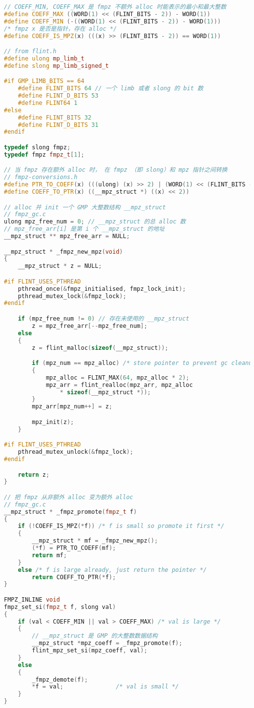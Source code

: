 \begin{lstlisting}[language=cpp]
// COEFF_MIN, COEFF_MAX 是 fmpz 不额外 alloc 时能表示的最小和最大整数
#define COEFF_MAX ((WORD(1) << (FLINT_BITS - 2)) - WORD(1))
#define COEFF_MIN (-((WORD(1) << (FLINT_BITS - 2)) - WORD(1)))
/* fmpz x 是否是指针，存在 alloc */
#define COEFF_IS_MPZ(x) (((x) >> (FLINT_BITS - 2)) == WORD(1))

// from flint.h
#define ulong mp_limb_t
#define slong mp_limb_signed_t

#if GMP_LIMB_BITS == 64
    #define FLINT_BITS 64 // 一个 limb 或者 slong 的 bit 数
    #define FLINT_D_BITS 53
    #define FLINT64 1
#else 
    #define FLINT_BITS 32
    #define FLINT_D_BITS 31
#endif

typedef slong fmpz;
typedef fmpz fmpz_t[1];

// 当 fmpz 存在额外 alloc 时， 在 fmpz （即 slong）和 mpz 指针之间转换
// fmpz-conversions.h
#define PTR_TO_COEFF(x) (((ulong) (x) >> 2) | (WORD(1) << (FLINT_BITS - 2)))
#define COEFF_TO_PTR(x) ((__mpz_struct *) ((x) << 2))

// alloc 并 init 一个 GMP 大整数结构 __mpz_struct
// fmpz_gc.c
ulong mpz_free_num = 0; // __mpz_struct 的总 alloc 数
// mpz_free_arr[i] 是第 i 个 __mpz_struct 的地址
__mpz_struct ** mpz_free_arr = NULL;

__mpz_struct * _fmpz_new_mpz(void)
{
    __mpz_struct * z = NULL;

#if FLINT_USES_PTHREAD
    pthread_once(&fmpz_initialised, fmpz_lock_init);
    pthread_mutex_lock(&fmpz_lock);
#endif

    if (mpz_free_num != 0) // 存在未使用的 __mpz_struct
        z = mpz_free_arr[--mpz_free_num];
    else
    {
        z = flint_malloc(sizeof(__mpz_struct));

        if (mpz_num == mpz_alloc) /* store pointer to prevent gc cleanup */
        {
            mpz_alloc = FLINT_MAX(64, mpz_alloc * 2);
            mpz_arr = flint_realloc(mpz_arr, mpz_alloc
                * sizeof(__mpz_struct *));
        }
        mpz_arr[mpz_num++] = z;

        mpz_init(z);
    }

#if FLINT_USES_PTHREAD
    pthread_mutex_unlock(&fmpz_lock);
#endif

    return z;
}

// 把 fmpz 从非额外 alloc 变为额外 alloc
// fmpz_gc.c
__mpz_struct * _fmpz_promote(fmpz_t f)
{
    if (!COEFF_IS_MPZ(*f)) /* f is small so promote it first */
    {
        __mpz_struct * mf = _fmpz_new_mpz();
        (*f) = PTR_TO_COEFF(mf);
        return mf;
    }
    else /* f is large already, just return the pointer */
        return COEFF_TO_PTR(*f);
}

FMPZ_INLINE void
fmpz_set_si(fmpz_t f, slong val)
{
    if (val < COEFF_MIN || val > COEFF_MAX) /* val is large */
    {
        // __mpz_struct 是 GMP 的大整数数据结构
        __mpz_struct *mpz_coeff = _fmpz_promote(f);
        flint_mpz_set_si(mpz_coeff, val);
    }
    else
    {
        _fmpz_demote(f);
        *f = val;               /* val is small */
    }
}
\end{lstlisting}
